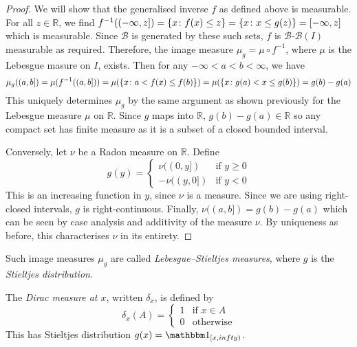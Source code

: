\begin{proof}
	We will show that the generalised inverse \( f \) as defined above is measurable.
	For all \( z \in \mathbb R \), we find \( f^{-1}((-\infty,z]) = \qty{x \colon f(x) \leq z} = \qty{x \colon x \leq g(z)} = [-\infty,z] \) which is measurable.
	Since \( \mathcal B \) is generated by these such sets, \( f \) is \( \mathcal B \)-\(\mathcal B(I) \) measurable as required.
	Therefore, the image measure \( \mu_g = \mu \circ f^{-1} \), where \( \mu \) is the Lebesgue masure on \( I \), exists.
	Then for any \( -\infty < a < b < \infty \), we have
	\[ \mu_g((a,b]) = \mu(f^{-1}((a,b])) = \mu(\qty{x \colon a < f(x) \leq f(b)}) = \mu(\qty{x \colon g(a) < x \leq g(b)}) = g(b) - g(a) \]
	This uniquely determines \( \mu_g \) by the same argument as shown previously for the Lebesgue measure \( \mu \) on \( \mathbb R \).
	Since \( g \) maps into \( \mathbb R \), \( g(b) - g(a) \in \mathbb R \) so any compact set has finite measure as it is a subset of a closed bounded interval.

	Conversely, let \( \nu \) be a Radon measure on \( \mathbb R \).
	Define
	\[ g(y) = \begin{cases}
		\nu((0,y]) & \text{if } y \geq 0 \\
		-\nu((y,0]) & \text{if } y < 0
	\end{cases} \]
	This is an increasing function in \( y \), since \( \nu \) is a measure.
	Since we are using right-closed intervals, \( g \) is right-continuous.
	Finally, \( \nu((a,b]) = g(b) - g(a) \) which can be seen by case analysis and additivity of the measure \( \nu \).
	By uniqueness as before, this characterises \( \nu \) in its entirety.
\end{proof}
\begin{remark}
	Such image measures \( \mu_g \) are called \emph{Lebesgue--Stieltjes measures}, where \( g \) is the \emph{Stieltjes distribution}.
\end{remark}
\begin{example}
	The \emph{Dirac measure at \( x \)}, written \( \delta_x \), is defined by
	\[ \delta_x(A) = \begin{cases}
		1 & \text{if } x \in A \\
		0 & \text{otherwise}
	\end{cases} \]
	This has Stieltjes distribution \( g(x) = \mathbbm 1_{[x,infty)} \).
\end{example}

